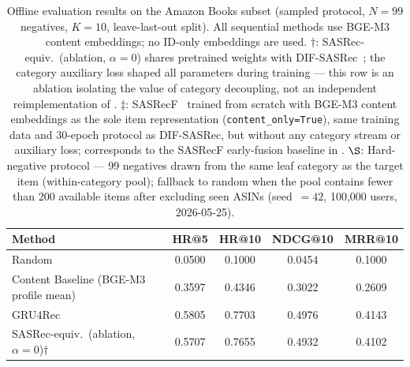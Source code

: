 
\begin{table}[ht]
\centering
\caption{%
  Offline evaluation results on the Amazon Books subset
  (sampled protocol, $N{=}99$ negatives, $K{=}10$, leave-last-out split).
  All sequential methods use BGE-M3 content embeddings; no ID-only embeddings are used.
  $\dagger$: SASRec-equiv.\ (ablation, $\alpha{=}0$) shares pretrained weights with
  DIF-SASRec~\cite{xie2022difsasrec}; the category auxiliary loss shaped all parameters
  during training --- this row is an ablation isolating the value of category decoupling,
  not an independent reimplementation of \citet{kang2018self}.
  $\ddagger$: SASRecF~\cite{kang2018self} trained from scratch with BGE-M3 content
  embeddings as the sole item representation (\texttt{content\_only=True}), same training
  data and 30-epoch protocol as DIF-SASRec, but without any category stream or auxiliary
  loss; corresponds to the SASRecF early-fusion baseline in \citet{xie2022difsasrec}.
  $\S$: Hard-negative protocol --- 99 negatives drawn from the same leaf category as the
  target item (within-category pool); fallback to random when the pool contains fewer than
  200 available items after excluding seen ASINs (seed~$=42$, 100{,}000 users, 2026-05-25).
}
\label{tab:comparison}
\begin{tabular}{lcccc}
\hline
\textbf{Method} & \textbf{HR@5} & \textbf{HR@10} & \textbf{NDCG@10} & \textbf{MRR@10} \\
\hline
Random & 0.0500 & 0.1000 & 0.0454 & 0.1000 \\
\hline
Content Baseline (BGE-M3 profile mean)  & 0.3597 & 0.4346 & 0.3022 & 0.2609 \\
GRU4Rec~\cite{hidasi2016gru4rec}        & 0.5805 & 0.7703 & 0.4976 & 0.4143 \\
SASRec-equiv.~(ablation, $\alpha{=}0$)$\dagger$  & 0.5707 & 0.7655 & 0.4932 & 0.4102 \\

\end{tabular}
\end{table}
